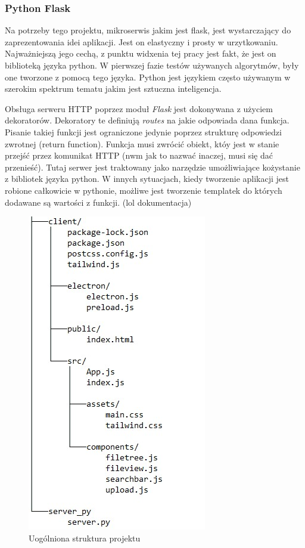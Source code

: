 \documentclass[12pt,a4paper,twoside]{article}
\begin{document}
\subsubsection*{Python Flask}
Na potrzeby tego projektu, mikroserwis jakim jest flask, jest wystarczający do zaprezentowania idei aplikacji. Jest on elastyczny i prosty w urzytkowaniu. Najważniejszą jego cechą, z punktu widxenia tej pracy jest fakt, że jest on biblioteką języka python. W pierwszej fazie testów używanych algorytmów, były one tworzone z pomocą tego języka. Python jest językiem często używanym w szerokim spektrum tematu jakim jest sztuczna inteligencja.\par
Obsługa serweru HTTP poprzez moduł \textit{Flask} jest dokonywana z użyciem dekoratorów. Dekoratory te definiują \textit{routes} na jakie odpowiada dana funkcja. Pisanie takiej funkcji jest ograniczone jedynie poprzez strukturę odpowiedzi zwrotnej (return function). Funkcja musi zwrócić obiekt, któy jest w stanie przejść przez komunikat HTTP (nwm jak to nazwać inaczej, musi się dać przenieść). Tutaj serwer jest traktowany jako narzędzie umożliwiające kożystanie z bibliotek języka python. W innych sytuacjach, kiedy tworzenie aplikacji jest robione całkowicie w pythonie, możliwe jest tworzenie templatek do których dodawane są wartości z funkcji. (lol dokumentacja)
\begin{figure}[h!]
\centering
  \includegraphics{img/file_structure.jpg}
  \caption{Uogólniona struktura projektu}
\end{figure}
\newpage
\end{document}
